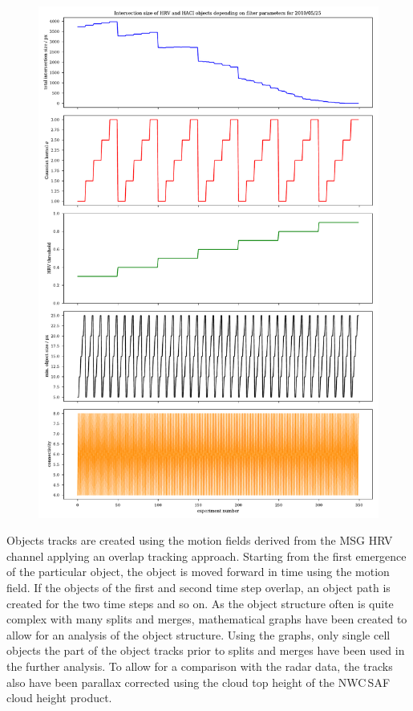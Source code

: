 \begin{figure}[htbp]
\centering
\includegraphics[height=\textheight]{Grafiken/Abbildungen/parameter_plot.pdf}
\caption{}
\label{fig:filter-parameters}
\end{figure}

Objects tracks are created using the motion fields derived from the MSG HRV channel applying an overlap tracking approach. Starting from the first emergence of the particular object, the object is moved forward in time using the motion field. If the objects of the first and second time step overlap, an object path is created for the two time steps and so on. As the object structure often is quite complex with many splits and merges, mathematical graphs have been created to allow for an analysis of the object structure. Using the graphs, only single cell objects the part of the object tracks prior to splits and merges have been used in the further analysis. To allow for a comparison with the radar data, the tracks also have been parallax corrected using the cloud top height of the NWC\,SAF cloud height product.

